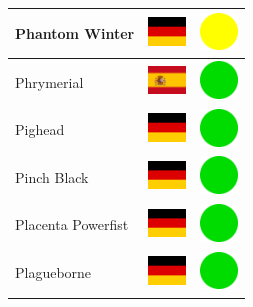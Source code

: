 \documentclass[12pt, a4paper, twoside]{report}
\begin{document}
\begin{center}
\begin{longtable}{|p{5cm}|p{2cm}|p{2cm}|}
 Phantom Winter                                             & \includegraphics[width=1cm]{../4x3/de} &   \includegraphics[width=1cm]{../likes/m} \\ \hline
 Phrymerial                                                 & \includegraphics[width=1cm]{../4x3/es} &   \includegraphics[width=1cm]{../likes/y} \\ \hline
 Pighead                                                    & \includegraphics[width=1cm]{../4x3/de} &   \includegraphics[width=1cm]{../likes/y} \\ \hline
 Pinch Black                                                & \includegraphics[width=1cm]{../4x3/de} &   \includegraphics[width=1cm]{../likes/y} \\ \hline
 Placenta Powerfist                                         & \includegraphics[width=1cm]{../4x3/de} &   \includegraphics[width=1cm]{../likes/y} \\ \hline
 Plagueborne                                                & \includegraphics[width=1cm]{../4x3/de} &   \includegraphics[width=1cm]{../likes/y} \\ \hline

\end{longtable}
\end{center}
\end{document}
